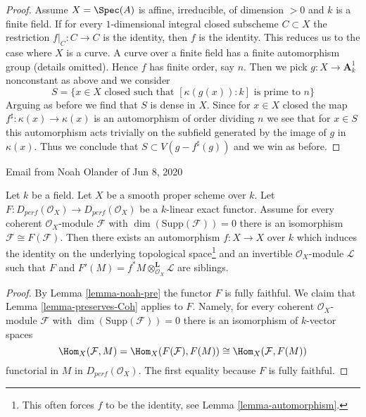 \begin{proof}
\medskip\noindent
Assume $X = \Spec(A)$ is affine, irreducible, of dimension $> 0$
and $k$ is a finite field. If for every $1$-dimensional integral
closed subscheme $C \subset X$ the restriction $f|_C : C \to C$
is the identity, then $f$ is the identity. This reduces us to the
case where $X$ is a curve. A curve over a finite field has a
finite automorphism group (details omitted). Hence $f$ has finite
order, say $n$. Then we pick $g : X \to \mathbf{A}^1_k$
nonconstant as above and we consider
$$
S = \{x \in X\text{ closed such that }[\kappa(g(x)) : k]
\text{ is prime to }n\}
$$
Arguing as before we find that $S$ is dense in $X$. Since
for $x \in X$ closed the map
$f^\sharp : \kappa(x) \to \kappa(x)$ is an
automorphism of order dividing $n$
we see that for $x \in S$ this automorphism
acts trivially on the subfield generated by
the image of $g$ in $\kappa(x)$. Thus we conclude that
$S \subset V(g - f^\sharp(g))$ and we win as before.
\end{proof}

\begin{lemma}
\label{lemma-noah}
\begin{reference}
Email from Noah Olander of Jun 8, 2020
\end{reference}
Let $k$ be a field. Let $X$ be a smooth proper scheme over $k$.
Let $F : D_{perf}(\mathcal{O}_X) \to D_{perf}(\mathcal{O}_X)$
be a $k$-linear exact functor. Assume for every coherent
$\mathcal{O}_X$-module $\mathcal{F}$ with $\dim(\text{Supp}(\mathcal{F})) = 0$
there is an isomorphism $\mathcal{F} \cong F(\mathcal{F})$.
Then there exists an automorphism $f : X \to X$ over $k$
which induces the identity on the
underlying topological space\footnote{This often forces $f$
to be the identity, see Lemma \ref{lemma-automorphism}.} and an
invertible $\mathcal{O}_X$-module $\mathcal{L}$
such that $F$ and $F'(M) = f^*M \otimes_{\mathcal{O}_X}^\mathbf{L} \mathcal{L}$
are siblings.
\end{lemma}

\begin{proof}
By Lemma \ref{lemma-noah-pre} the functor $F$ is fully faithful.
We claim that Lemma \ref{lemma-preserves-Coh} applies to $F$.
Namely, for every coherent $\mathcal{O}_X$-module $\mathcal{F}$
with $\dim(\text{Supp}(\mathcal{F})) = 0$ there is an isomorphism of
$k$-vector spaces
$$
\Hom_X(\mathcal{F}, M) = \Hom_X(F(\mathcal{F}), F(M))
\cong \Hom_X(\mathcal{F}, F(M))
$$
functorial in $M$ in $D_{perf}(\mathcal{O}_X)$. The first equality because
$F$ is fully faithful.
\end{proof}

